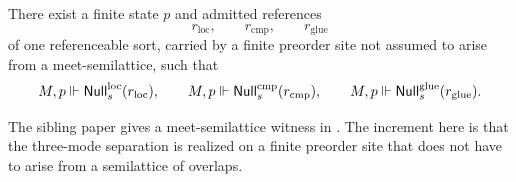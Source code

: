 \begin{proposition}\label{prop:finite-three-mode-model}
There exist a finite state $p$ and admitted references
\[
r_{\mathrm{loc}},\qquad r_{\mathrm{cmp}},\qquad r_{\mathrm{glue}}
\]
of one referenceable sort, carried by a finite preorder site not assumed to arise from a meet-semilattice, such that
\[
M,p\Vdash \mathsf{Null}^{\mathrm{loc}}_s(r_{\mathrm{loc}}),\qquad
M,p\Vdash \mathsf{Null}^{\mathrm{cmp}}_s(r_{\mathrm{cmp}}),\qquad
M,p\Vdash \mathsf{Null}^{\mathrm{glue}}_s(r_{\mathrm{glue}}).
\]
\end{proposition}

\begin{remark}
The sibling paper gives a meet-semilattice witness in \cite[Proposition~4.32]{MaZhang2026ConditionalGluingFailure}. The increment here is that the three-mode separation is realized on a finite preorder site that does not have to arise from a semilattice of overlaps.
\end{remark}

